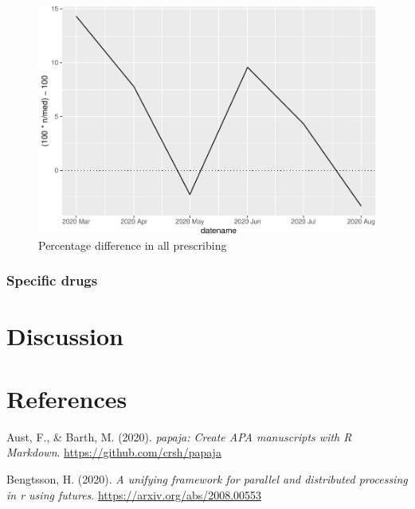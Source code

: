 \documentclass[
  english,
  man,floatsintext]{apa7}
\begin{document}
\begin{figure}
\centering
\includegraphics{paper_files/figure-latex/all-prescribing-pct-change-plot-1.pdf}
\caption{\label{fig:all-prescribing-pct-change-plot}Percentage difference in all prescribing}
\end{figure}

\hypertarget{specific-drugs}{%
\subsubsection{Specific drugs}\label{specific-drugs}}

\hypertarget{discussion}{%
\section{Discussion}\label{discussion}}

\newpage

\hypertarget{references}{%
\section{References}\label{references}}

\begingroup
\setlength{\parindent}{-0.5in}
\setlength{\leftskip}{0.5in}

\hypertarget{refs}{}
\leavevmode\hypertarget{ref-R-papaja}{}%
Aust, F., \& Barth, M. (2020). \emph{papaja: Create APA manuscripts with R Markdown}. \url{https://github.com/crsh/papaja}

\leavevmode\hypertarget{ref-R-future}{}%
Bengtsson, H. (2020). \emph{A unifying framework for parallel and distributed processing in r using futures}. \url{https://arxiv.org/abs/2008.00553}
\end{document}
